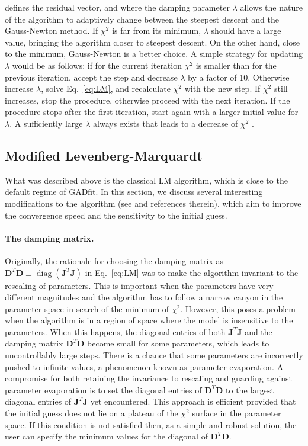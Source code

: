 \documentclass{article}
\DeclareMathOperator{\diag}{diag}
\begin{document}
defines the residual vector, and where the damping parameter $\lambda$ allows the nature of the algorithm to adaptively change between the steepest descent and the Gauss-Newton method. If $\chi^2$ is far from its minimum, $\lambda$ should have a large value, bringing the algorithm closer to steepest descent. On the other hand, close to the minimum, Gauss-Newton is a better choice. A simple strategy for updating $\lambda$ would be as follows: if for the current iteration $\chi^2$ is smaller than for the previous iteration, accept the step and decrease $\lambda$ by a factor of 10. Otherwise increase $\lambda$, solve Eq.~\eqref{eq:LM}, and recalculate $\chi^2$ with the new step. If $\chi^2$ still increases, stop the procedure, otherwise proceed with the next iteration. If the procedure stops after the first iteration, start again with a larger initial value for $\lambda$. A sufficiently large $\lambda$ always exists that leads to a decrease of $\chi^2$ \cite{marquardt63}.

\subsection{\label{sec:mod_lm}Modified Levenberg-Marquardt}

What was described above is the classical LM algorithm, which is close to the default regime of GADfit. In this section, we discuss several interesting modifications to the algorithm (see \cite{transtrum10, transtrum11, transtrum12} and references therein), which aim to improve the convergence speed and the sensitivity to the initial guess.

\paragraph{The damping matrix.} Originally, the rationale for choosing the damping matrix as $\bm D^T\bm D \equiv \diag(\bm J^T\bm J)$ in Eq.~\eqref{eq:LM} was to make the algorithm invariant to the rescaling of parameters. This is important when the parameters have very different magnitudes and the algorithm has to follow a narrow canyon in the parameter space in search of the minimum of $\chi^2$. However, this poses a problem when the algorithm is in a region of space where the model is insensitive to the parameters. When this happens, the diagonal entries of both $\bm J^T\bm J$ and the damping matrix $\bm D^T\bm D$ become small for some parameters, which leads to uncontrollably large steps. There is a chance that some parameters are incorrectly pushed to infinite values, a phenomenon known as parameter evaporation. A compromise for both retaining the invariance to rescaling and guarding against parameter evaporation is to set the diagonal entries of $\bm D^T\bm D$ to the largest diagonal entries of $\bm J^T\bm J$ yet encountered. This approach is efficient provided that the initial guess does not lie on a plateau of the $\chi^2$ surface in the parameter space. If this condition is not satisfied then, as a simple and robust solution, the user can specify the minimum values for the diagonal of $\bm D^T\bm D$.
\end{document}
